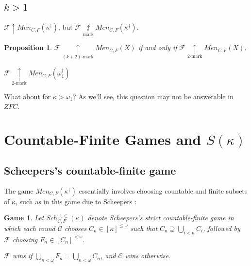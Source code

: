 \documentclass{beamer}
\newtheorem{proposition}[theorem]{Proposition}
\theoremstyle{example}
\newtheorem{game}[theorem]{Game}
\theoremstyle{definition}
\newcommand{\win}{\uparrow}
\newcommand{\kmarkwin}[1]{\underset{#1\text{-mark}}{\uparrow}}
\newcommand{\notmarkwin}{\underset{\text{mark}}{\not\uparrow}}
\newcommand{\oneptlind}[1]{#1^\dagger} %
\newcommand{\menGame}[1]{Men_{C,F}\left({#1}\right)}
\newcommand{\schFillStrictGame}[1]{Sch^{\cup,\subset}_{C,F}\left({#1}\right)}
\newcommand{\<}{\langle}
\renewcommand{\>}{\rangle}
\newcommand{\pl}[1]{\mathscr{#1}}
\newcommand{\term}{\textit}
\begin{document}
\subsection{$k>1$}

\begin{frame}

  \begin{example}
    \(\pl F\win\menGame{\oneptlind\kappa}\), but
    \(\pl F\notmarkwin\menGame{\oneptlind\kappa}\).
  \end{example}

  \pause

  \begin{proposition}
    \(\pl F\kmarkwin{(k+2)}\menGame{X}\) if and only if
    \(\pl F\kmarkwin{2}\menGame{X}\).
  \end{proposition}

  \pause

  \begin{example}
    \(\pl F\kmarkwin{2}\menGame{\oneptlind\omega_1}\)
  \end{example}

  \vpause

  What about for \(\kappa>\omega_1\)? As we'll see, this question may
  not be answerable in \(ZFC\).
\end{frame}

\section{Countable-Finite Games and $S(\kappa)$}

\subsection{Scheepers's countable-finite game}

\begin{frame}
  The game \(\menGame{\oneptlind\kappa}\) essentially involves choosing
  countable and finite subsets of \(\kappa\), such as in this game due
  to Scheepers \cite{MR1129143}:

  \begin{game}
    Let \(\schFillStrictGame\kappa\) denote Scheepers's
    \term{strict countable-finite game}
    in which each round \(\pl C\) chooses \(C_n\in[\kappa]^{\leq\omega}\)
    such that \(C_n \supsetneq \bigcup_{i<n}C_i\), followed by \(\pl F\) choosing \(F_n\in[C_n]^{<\omega}\).

    \(\pl F\) wins if \(\bigcup_{n<\omega}F_n=\bigcup_{n<\omega}C_n\),
    and \(\pl C\) wins otherwise.
  \end{game}
\end{frame}
\end{document}
